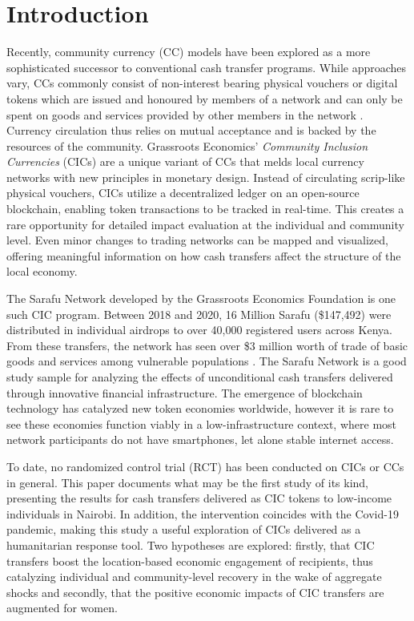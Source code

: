 \documentclass[12pt]{article}
\begin{document}
\section{Introduction} \label{sec:introduction}
Recently, community currency (CC) models have been explored as a more sophisticated successor to conventional cash transfer programs. While approaches vary, CCs commonly consist of non-interest bearing physical vouchers or digital tokens which are issued and honoured by members of a network and can only be spent on goods and services provided by other members in the network \citep{bendell2015re}. Currency circulation thus relies on mutual acceptance and is backed by the resources of the community. Grassroots Economics’ \textit{Community Inclusion Currencies} (CICs) are a unique variant of CCs that melds local currency networks with new principles in monetary design. Instead of circulating scrip-like physical vouchers, CICs utilize a decentralized ledger on an open-source blockchain, enabling token transactions to be tracked in real-time. This creates a rare opportunity for detailed impact evaluation at the individual and community level. Even minor changes to trading networks can be mapped and visualized, offering meaningful information on how cash transfers affect the structure of the local economy.

The Sarafu Network developed by the Grassroots Economics Foundation is one such CIC program. Between 2018 and 2020, 16 Million Sarafu (\$147,492) were distributed in individual airdrops to over 40,000 registered users across Kenya. From these transfers, the network has seen over \$3 million worth of trade of basic goods and services among vulnerable populations \citep{Grassroots2019}. The Sarafu Network is a good study sample for analyzing the effects of unconditional cash transfers delivered through innovative financial infrastructure. The emergence of blockchain technology has catalyzed new token economies worldwide, however it is rare to see these economies function viably in a low-infrastructure context, where most network participants do not have smartphones, let alone stable internet access.

To date, no randomized control trial (RCT) has been conducted on CICs or CCs in general. This paper documents what may be the first study of its kind, presenting the results for cash transfers delivered as CIC tokens to low-income individuals in Nairobi. In addition, the intervention coincides with the Covid-19 pandemic, making this study a useful exploration of CICs delivered as a humanitarian response tool. Two hypotheses are explored: firstly, that CIC transfers boost the location-based economic engagement of recipients, thus catalyzing individual and community-level recovery in the wake of aggregate shocks and secondly, that the positive economic impacts of CIC transfers are augmented for women.
\end{document}
